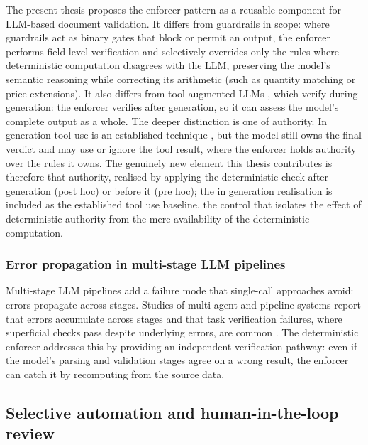 The present thesis proposes the enforcer pattern as a reusable component for LLM-based document validation. It differs from guardrails in scope: where guardrails act as binary gates that block or permit an output, the enforcer performs field level verification and selectively overrides only the rules where deterministic computation disagrees with the LLM, preserving the model's semantic reasoning while correcting its arithmetic (such as quantity matching or price extensions). It also differs from tool augmented LLMs \citep{schick2024}, which verify during generation: the enforcer verifies after generation, so it can assess the model's complete output as a whole. The deeper distinction is one of authority. In generation tool use is an established technique \citep{schick2024,goodell2025}, but the model still owns the final verdict and may use or ignore the tool result, where the enforcer holds authority over the rules it owns. The genuinely new element this thesis contributes is therefore that authority, realised by applying the deterministic check after generation (post hoc) or before it (pre hoc); the in generation realisation is included as the established tool use baseline, the control that isolates the effect of deterministic authority from the mere availability of the deterministic computation.

\subsubsection{Error propagation in multi-stage LLM pipelines}

Multi-stage LLM pipelines add a failure mode that single-call approaches avoid: errors propagate across stages. Studies of multi-agent and pipeline systems report that errors accumulate across stages and that task verification failures, where superficial checks pass despite underlying errors, are common \citep{ke2025,cemri2025,reid2025,zhang2025ocr}. The deterministic enforcer addresses this by providing an independent verification pathway: even if the model's parsing and validation stages agree on a wrong result, the enforcer can catch it by recomputing from the source data.


\subsection{Selective automation and human-in-the-loop review}
\label{sec:lr:selective}

